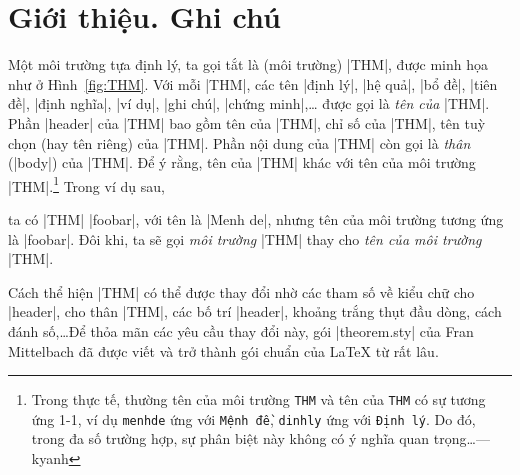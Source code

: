\section{\texorpdfstring{Giới thiệu. Ghi chú}{Gioi thieu. Ghi chu}}

Một môi trường tựa định lý, ta gọi tắt là (môi trường) |THM|,
được minh họa như ở Hình~\vref{fig:THM}.
Với mỗi |THM|, các tên |định lý|, |hệ quả|, |bổ đề|, |tiên đề|,
|định nghĩa|, |ví dụ|, |ghi chú|, |chứng minh|,\ldots
được gọi là \emph{tên của} |THM|.
Phần |header| của |THM| bao gồm tên của |THM|, chỉ số của |THM|,
tên tuỳ chọn (hay tên riêng) của |THM|. Phần nội dung của |THM|
còn gọi là \emph{thân} (|body|) của |THM|. Để ý rằng, tên của |THM| khác
với tên của môi trường |THM|.\footnote{Trong thực tế, thường tên
của môi trường \texttt{THM} và tên của \texttt{THM} có sự tương ứng
1-1, ví dụ \texttt{menhde} ứng với \texttt{Mệnh đề},
\texttt{dinhly} ứng với \texttt{Định lý}. Do đó, trong đa số trường hợp,
sự phân biệt này không có ý nghĩa quan trọng\ldots --- kyanh}
Trong ví dụ sau,
\begin{example}
  \newtheorem{foobar}{Menh de}
\end{example}
ta có |THM| |foobar|, với tên là |Menh de|, nhưng tên của môi trường
tương ứng là |foobar|. Đôi khi, ta sẽ gọi \emph{môi trường} |THM| thay cho
\emph{tên của môi trường} |THM|.

\medskip
Cách thể hiện |THM| có thể được thay đổi nhờ các tham số về
kiểu chữ cho |header|, cho thân |THM|, các bố trí |header|, khoảng trắng
thụt đầu dòng, cách đánh số,\ldots Để thỏa mãn các yêu cầu thay đổi này,
gói |theorem.sty| của Fran Mittelbach đã được viết và trở thành
gói chuẩn của \LaTeX{} từ rất lâu.

